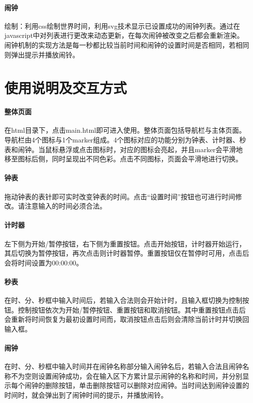 \documentclass[UTF8]{ctexart}
\begin{document}
	\paragraph{闹钟}
	绘制：利用css绘制世界时间，利用svg技术显示已设置成功的闹钟列表。通过在javascript中对列表进行更改来动态更新，在每次闹钟被改变之后都会重新渲染。闹钟机制的实现方法是每一秒都比较当前时间和闹钟的设置时间是否相同，若相同则弹出提示并播放闹铃。
	
	
	\section{使用说明及交互方式} %
	\paragraph{整体页面}
	在html目录下，点击main.html即可进入使用。整体页面包括导航栏与主体页面。导航栏由4个图标与1个marker组成。4个图标对应的功能分别为钟表、计时器、秒表和闹钟。当鼠标悬浮或点击图标时，对应的图标会亮起，并且marker会平滑地移至图标后侧，同时呈现出不同色彩。点击不同图标，页面会平滑地进行切换。
	\paragraph{钟表}
	拖动钟表的表针即可实时改变钟表的时间。点击“设置时间”按钮也可进行时间修改。请注意输入的时间必须合法。
	\paragraph{计时器}
	左下侧为开始/暂停按钮，右下侧为重置按钮。点击开始按钮，计时器开始运行，其后切换为暂停按钮，再次点击则计时器暂停。重置按钮仅在暂停时可用，点击后会将时间设置为00:00:00。
	\paragraph{秒表}
	在时、分、秒框中输入时间后，若输入合法则会开始计时，且输入框切换为控制按钮。控制按钮依次为开始/暂停按钮、重置按钮和取消按钮。其中重置按钮点击后会重新将时间恢复为最初设置时间而，取消按钮点击后则会清除当前计时并切换回输入框。
	\paragraph{闹钟}
	在时、分、秒框中输入时间并在闹钟名称部分输入闹钟名后，若输入合法且闹钟名称不为空则设置闹钟成功，会在输入区下方累计显示闹钟的名称和时间，并分别显示每个闹钟的删除按钮，单击删除按钮可以删除对应闹钟。当时间达到闹钟设置的时间时，就会弹出到了闹钟时间的提示，并播放闹铃。
	
\end{document}
